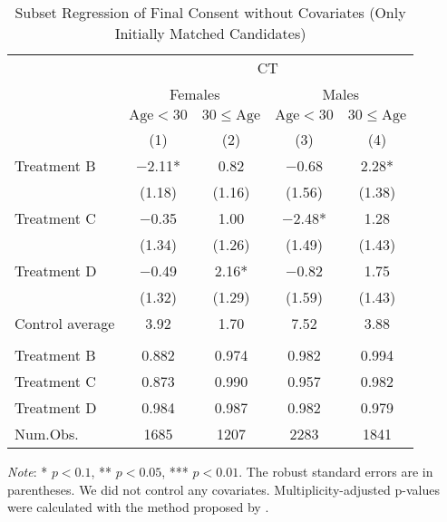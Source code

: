 \documentclass[12pt, a4paper]{article}
\begin{document}
\begin{table}[H]

\caption{\label{tab:lm-consent-subset1-init}Subset Regression of Final Consent without Covariates (Only Initially Matched Candidates)}
\centering
\fontsize{8}{10}\selectfont
\begin{threeparttable}
\begin{tabular}[t]{lcccc}
\toprule
\multicolumn{1}{c}{ } & \multicolumn{4}{c}{CT} \\
\cmidrule(l{3pt}r{3pt}){2-5}
\multicolumn{1}{c}{ } & \multicolumn{2}{c}{Females} & \multicolumn{2}{c}{Males} \\
\cmidrule(l{3pt}r{3pt}){2-3} \cmidrule(l{3pt}r{3pt}){4-5}
\multicolumn{1}{c}{ } & \multicolumn{1}{c}{$\text{Age} < 30$} & \multicolumn{1}{c}{$30 \le \text{Age}$} & \multicolumn{1}{c}{$\text{Age} < 30$} & \multicolumn{1}{c}{$30 \le \text{Age}$} \\
\cmidrule(l{3pt}r{3pt}){2-2} \cmidrule(l{3pt}r{3pt}){3-3} \cmidrule(l{3pt}r{3pt}){4-4} \cmidrule(l{3pt}r{3pt}){5-5}
  & (1) & (2) & (3) & (4)\\
\midrule
Treatment B & \num{-2.11}* & \num{0.82} & \num{-0.68} & \num{2.28}*\\
 & (\num{1.18}) & (\num{1.16}) & (\num{1.56}) & (\num{1.38})\\
Treatment C & \num{-0.35} & \num{1.00} & \num{-2.48}* & \num{1.28}\\
 & (\num{1.34}) & (\num{1.26}) & (\num{1.49}) & (\num{1.43})\\
Treatment D & \num{-0.49} & \num{2.16}* & \num{-0.82} & \num{1.75}\\
 & (\num{1.32}) & (\num{1.29}) & (\num{1.59}) & (\num{1.43})\\
\midrule
Control average & 3.92 & 1.70 & 7.52 & 3.88\\
\addlinespace[0.3em]
\multicolumn{5}{l}{\textit{Multiplicity-adjusted p-values}}\\
\hspace{1em}Treatment B & 0.882 & 0.974 & 0.982 & 0.994\\
\hspace{1em}Treatment C & 0.873 & 0.990 & 0.957 & 0.982\\
\hspace{1em}Treatment D & 0.984 & 0.987 & 0.982 & 0.979\\
Num.Obs. & \num{1685} & \num{1207} & \num{2283} & \num{1841}\\
\bottomrule
\end{tabular}
\begin{tablenotes}
\item \emph{Note}: * $p < 0.1$, ** $p < 0.05$, *** $p < 0.01$. The robust standard errors are in parentheses. We did not control any covariates. Multiplicity-adjusted p-values were calculated with the method proposed by \cite{List2019}.
\end{tablenotes}
\end{threeparttable}
\end{table}
\end{document}
